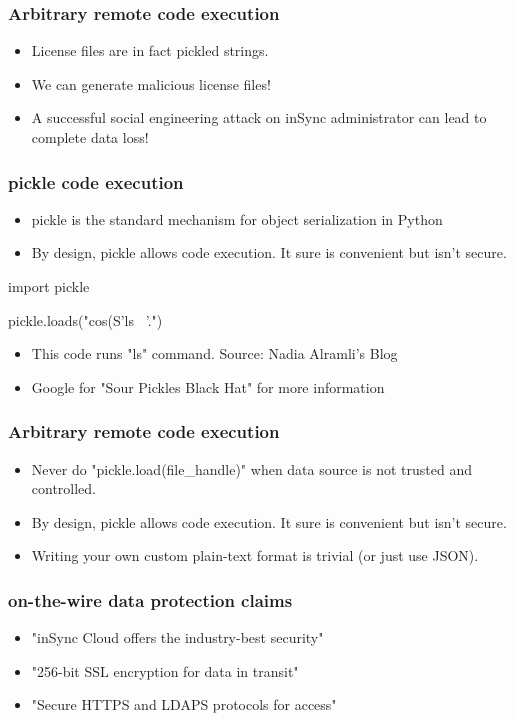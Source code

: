 \documentclass{beamer}
\begin{document}
\begin{frame}
	\frametitle{Arbitrary remote code execution}
	\begin{itemize}
		\item License files are in fact pickled strings.
		\item We can generate malicious license files!
		\item A successful social engineering attack on
		inSync administrator can lead to complete
		data loss!
	\end{itemize}
\end{frame}

\begin{frame}[fragile]
	\frametitle{pickle code execution}
	\begin{itemize}
		\item pickle is the standard mechanism for object serialization in Python
		\item By design, pickle allows code execution. It sure is convenient but isn't secure.
	\end{itemize}
	\begin{python}
		import pickle

		pickle.loads("cos\nsystem\n(S'ls ~'\ntR.")
	\end{python}
	\begin{itemize}
		\item This code runs "ls" command. Source: Nadia Alramli's Blog
		\item Google for "Sour Pickles Black Hat" for more information
	\end{itemize}
\end{frame}

\begin{frame}
	\frametitle{Arbitrary remote code execution}
	\begin{itemize}
		\item Never do "pickle.load(file\_handle)" when data
		source is not trusted and controlled.
		\item By design, pickle allows code execution. It
		sure is convenient but isn't secure.
		\item Writing your own custom plain-text format is
		trivial (or just use JSON).
	\end{itemize}
\end{frame}

\begin{frame}
	\frametitle{on-the-wire data protection claims}
	\begin{itemize}
		\item "inSync Cloud offers the industry-best security"
		\item "256-bit SSL encryption for data in transit"
		\item "Secure HTTPS and LDAPS protocols for
		access"
	\end{itemize}
\end{frame}
\end{document}
